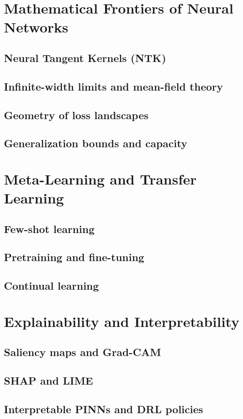 \chapter{Mathematical Frontiers of Neural Networks}
\section{Neural Tangent Kernels (NTK)}
\section{Infinite-width limits and mean-field theory}
\section{Geometry of loss landscapes}
\section{Generalization bounds and capacity}

\chapter{Meta-Learning and Transfer Learning}
\section{Few-shot learning}
\section{Pretraining and fine-tuning}
\section{Continual learning}

\chapter{Explainability and Interpretability}
\section{Saliency maps and Grad-CAM}
\section{SHAP and LIME}
\section{Interpretable PINNs and DRL policies}

